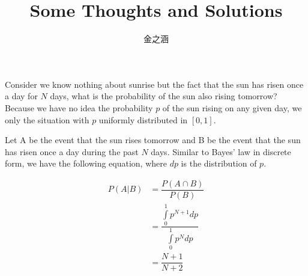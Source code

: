 

\title{Some Thoughts and Solutions}
\author{金之涵}
\date{}


	\maketitle
	\newpage
	
	\begin{prob} 
		Consider we know nothing about sunrise but the fact that the sun has risen once a day for $N$ days, what is the probability of the sun also rising tomorrow? Because we have no idea the probability $p$ of the sun rising on any given day, we only the situation with $p$ uniformly distributed in $[0, 1]$.
	
		\sol
		Let A be the event that the sun rises tomorrow and B be the event that the sun has risen once a day during the past $N$ days. Similar to Bayes' law in discrete form, we have the following equation, where $dp$ is the distribution of $p$.
		
		\begin{equation*}
			\begin{array}{cc}
				P(A|B)  &= \dfrac{P(A \cap B)}{P(B)} \\
						&= \dfrac{\int\limits_{0}^{1}p^{N + 1} dp}{\int\limits_{0}^{1}p^{N} dp} \\
						&= \dfrac{N + 1}{N + 2}
			\end{array}
		\end{equation*}
		
	\end{prob}

	\newpage
	
